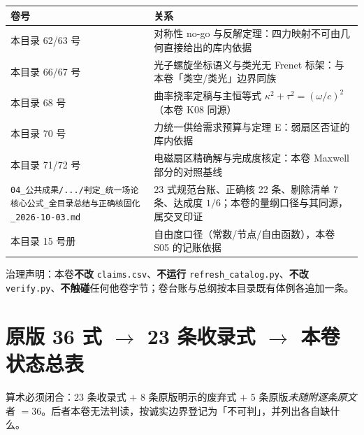 \documentclass[UTF8,fontset=fandol,11pt]{ctexart}
\newcommand{\code}[1]{\texttt{#1}}
\begin{document}
\begin{center}
\begin{tabular}{p{3.0cm}p{9.8cm}}
\toprule
卷号 & 关系 \\
\midrule
本目录 62/63 号 & 对称性 no-go 与反解定理：四力映射不可由几何直接给出的库内依据 \\
本目录 66/67 号 & 光子螺旋坐标语义与类光无 Frenet 标架：与本卷「类空/类光」边界同族 \\
本目录 68 号 & 曲率挠率定稿与主恒等式 $\kappa^2+\tau^2=(\omega/c)^2$（本卷 K08 同源） \\
本目录 70 号 & 力统一供给需求预算与定理 E：弱扇区否证的库内依据 \\
本目录 71/72 号 & 电磁扇区精确解与完成度核定：本卷 Maxwell 部分的对照基线 \\
\code{04\_公共成果/.../判定\_统一场论核心公式\_全目录总结与正确核固化\_2026-10-03.md} & 23 式规范台账、正确核 22 条、剔除清单 7 条、达成度 $1/6$；本卷的量纲口径与其同源，属交叉印证 \\
本目录 15 号册 & 自由度口径（常数/节点/自由函数），本卷 S05 的记账依据 \\
\bottomrule
\end{tabular}
\end{center}

治理声明：本卷\textbf{不改} \code{claims.csv}、\textbf{不运行} \code{refresh\_catalog.py}、\textbf{不改} \code{verify.py}、\textbf{不触碰}任何他卷字节；卷台账与总纲按本目录既有体例各追加一条。

\appendix
\section{原版 36 式 $\to$ 23 条收录式 $\to$ 本卷状态总表}
\label{app:a}

\noindent
算术必须闭合：$23$ 条收录式 $+$ 8 条原版明示的废弃式 $+$ 5 条原版\emph{未随附逐条原文}者 $=36$。后者本卷无法判读，按诚实边界登记为「不可判」，并列出各自缺什么。
\end{document}
